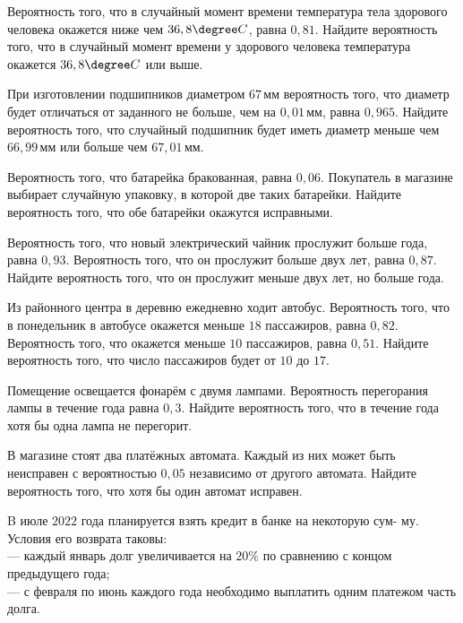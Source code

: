\begin{consultation}
	\begin{listofex}
		\item Вероятность того, что в случайный момент времени температура тела здорового человека окажется ниже чем \( 36,8\degree C \), равна \( 0,81 \). Найдите вероятность того, что в случайный момент времени у здорового человека температура окажется \( 36,8\degree C \) или выше.
		\item При изготовлении подшипников диаметром \( 67 \) мм вероятность того, что диаметр будет отличаться от заданного не больше, чем на \( 0,01 \) мм, равна \( 0,965 \). Найдите вероятность того, что случайный подшипник будет иметь диаметр меньше чем \( 66,99 \) мм или больше чем \( 67,01 \) мм.
		\item Вероятность того, что батарейка бракованная, равна \( 0,06 \). Покупатель в магазине выбирает случайную упаковку, в которой две таких батарейки. Найдите вероятность того, что обе батарейки окажутся исправными.
		\item Вероятность того, что новый электрический чайник прослужит больше года, равна \( 0,93 \). Вероятность того, что он прослужит больше двух лет, равна \( 0,87 \). Найдите вероятность того, что он прослужит меньше двух лет, но больше года.
		\item Из районного центра в деревню ежедневно ходит автобус. Вероятность того, что в понедельник в автобусе окажется меньше \( 18 \) пассажиров, равна \( 0,82 \). Вероятность того, что окажется меньше \( 10 \) пассажиров, равна \( 0,51 \). Найдите вероятность того, что число пассажиров будет от \( 10 \) до \( 17 \).
		\item Помещение освещается фонарём с двумя лампами. Вероятность перегорания лампы в течение года равна \( 0,3 \). Найдите вероятность того, что в течение года хотя бы одна лампа не перегорит.
		\item В магазине стоят два платёжных автомата. Каждый из них может быть неисправен с вероятностью \( 0,05 \) независимо от другого автомата. Найдите вероятность того, что хотя бы один автомат исправен.
		\item B июле \( 2022 \) года планируется взять кредит в банке на некоторую сум-
		му. Условия его возврата таковы:\\
		— каждый январь долг увеличивается на \( 20\% \) по сравнению с концом предыдущего года;\\
		— с февраля по июнь каждого года необходимо выплатить одним платежом часть долга.\\

\end{listofex}
\end{consultation}
